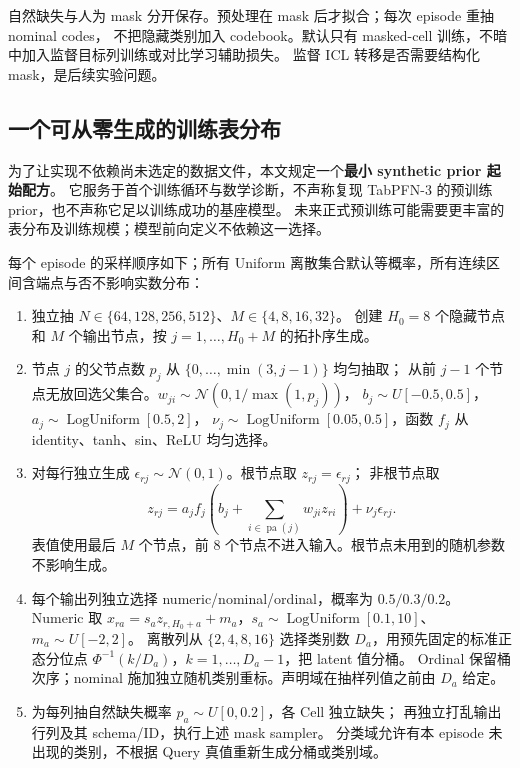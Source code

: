 \documentclass[11pt,UTF8,fontset=fandol]{ctexart}
\begin{document}
自然缺失与人为 mask 分开保存。预处理在 mask 后才拟合；每次 episode 重抽 nominal codes，
不把隐藏类别加入 codebook。默认只有 masked-cell 训练，不暗中加入监督目标列训练或对比学习辅助损失。
监督 ICL 转移是否需要结构化 mask，是后续实验问题。

\subsection{一个可从零生成的训练表分布}
\label{sec:prior}
为了让实现不依赖尚未选定的数据文件，本文规定一个\textbf{最小 synthetic prior 起始配方}。
它服务于首个训练循环与数学诊断，不声称复现 TabPFN-3 的预训练 prior，也不声称它足以训练成功的基座模型。
未来正式预训练可能需要更丰富的表分布及训练规模；模型前向定义不依赖这一选择。

每个 episode 的采样顺序如下；所有 Uniform 离散集合默认等概率，所有连续区间含端点与否不影响实数分布：
\begin{enumerate}
\item 独立抽 $N\in\{64,128,256,512\}$、$M\in\{4,8,16,32\}$。
创建 $H_0=8$ 个隐藏节点和 $M$ 个输出节点，按 $j=1,\ldots,H_0+M$ 的拓扑序生成。
\item 节点 $j$ 的父节点数 $p_j$ 从 $\{0,\ldots,\min(3,j-1)\}$ 均匀抽取；
从前 $j-1$ 个节点无放回选父集合。$w_{ji}\sim\mathcal N(0,1/\max(1,p_j))$，
$b_j\sim U[-0.5,0.5]$，$a_j\sim\operatorname{LogUniform}[0.5,2]$，
$\nu_j\sim\operatorname{LogUniform}[0.05,0.5]$，函数 $f_j$ 从 identity、tanh、sin、ReLU 均匀选择。
\item 对每行独立生成 $\epsilon_{rj}\sim\mathcal N(0,1)$。根节点取 $z_{rj}=\epsilon_{rj}$；
非根节点取
\begin{equation}
 z_{rj}=a_j f_j\!\left(b_j+\sum_{i\in\operatorname{pa}(j)}w_{ji}z_{ri}\right)+\nu_j\epsilon_{rj}.
 \label{eq:synthetic}
\end{equation}
表值使用最后 $M$ 个节点，前 8 个节点不进入输入。根节点未用到的随机参数不影响生成。
\item 每个输出列独立选择 numeric/nominal/ordinal，概率为 $0.5/0.3/0.2$。
Numeric 取 $x_{ra}=s_a z_{r,H_0+a}+m_a$，$s_a\sim\operatorname{LogUniform}[0.1,10]$、$m_a\sim U[-2,2]$。
离散列从 $\{2,4,8,16\}$ 选择类别数 $D_a$，用预先固定的标准正态分位点
$\Phi^{-1}(k/D_a)$，$k=1,\ldots,D_a-1$，把 latent 值分桶。
Ordinal 保留桶次序；nominal 施加独立随机类别重标。声明域在抽样列值之前由 $D_a$ 给定。
\item 为每列抽自然缺失概率 $p_a\sim U[0,0.2]$，各 Cell 独立缺失；
再独立打乱输出行列及其 schema/ID，执行上述 mask sampler。
分类域允许有本 episode 未出现的类别，不根据 Query 真值重新生成分桶或类别域。
\end{enumerate}
\end{document}

